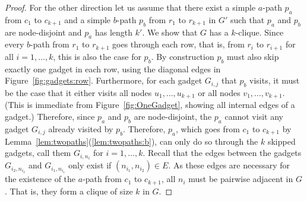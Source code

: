 \documentclass[a4paper,english]{lipics-v2016}
\theoremstyle{plain}
\begin{document}
\begin{proof}
  
   For the other direction let us assume that there exist a simple
   $a$-path $p_a$ from $c_1$ to $c_{k+1}$ and a simple $b$-path $p_b$ from $r_1$ to $r_{k+1}$ in $G'$ such that $p_a$
   and $p_b$ are node-disjoint and $p_a$ has length $k'$.  We show
   that $G$ has a $k$-clique.
                     Since every $b$-path from $r_1$ to $r_{k+1}$ goes through
   each row, that is, from $r_i$ to $r_{i+1}$ for all $i=1,\ldots,k$,
   this is also the case for $p_b$. By construction $p_b$ must also
   skip exactly one gadget in each row, using the diagonal edges in
   Figure~\ref{fig:gadgets:row}. Furthermore, for each gadget
   $G_{i,j}$ that $p_b$ visits, it must be the case that it either
   visits all nodes $u_1, \ldots, u_{k+1}$ or all nodes $v_1, \ldots,
   v_{k+1}$. (This is immediate from Figure~\ref{fig:OneGadget},
   showing all internal edges of a gadget.)  Therefore, since $p_a$
   and $p_b$ are node-disjoint, the $p_a$ cannot visit any gadget
   $G_{i,j}$ already visited by $p_b$.  Therefore, $p_a$, which goes
   from $c_1$ to $c_{k+1}$ by
   Lemma~\ref{lem:twopaths}(\ref{lem:twopaths:b}), can only do so
   through the $k$ skipped gadgets, call them $G_{i,n_i}$ for
   $i=1,\ldots,k$. Recall that the edges between the gadgets
   $G_{i_2,n_{i_2}}$ and $G_{i_1,n_{i_1}}$ only exist if
   $(n_{i_1},n_{i_2}) \in E$.  As these edges are necessary for the
   existence of the $a$-path from $c_1$ to $c_{k+1}$, all $n_i$
   must be pairwise adjacent in $G$. That is, they form a clique of
   size $k$ in $G$.
 \end{proof}
 
\end{document}
